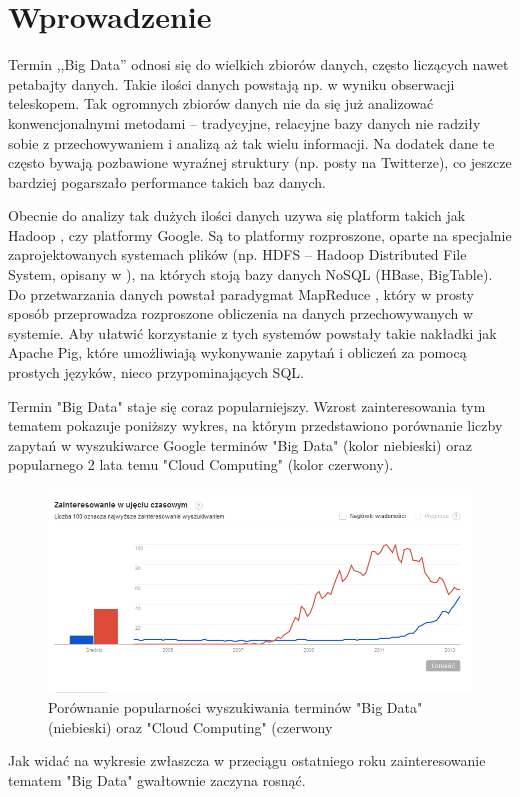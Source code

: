 \section{Wprowadzenie}
\label{sec:Wprowadzenie}

Termin ,,Big Data'' odnosi się do wielkich zbiorów danych, często liczących nawet petabajty danych. Takie ilości danych powstają np. w wyniku obserwacji teleskopem. Tak ogromnych zbiorów danych nie da się już analizować konwencjonalnymi metodami -- tradycyjne, relacyjne bazy danych nie radziły sobie z przechowywaniem i analizą aż tak wielu informacji. Na dodatek dane te często bywają pozbawione wyraźnej struktury (np. posty na Twitterze), co jeszcze bardziej pogarszało performance takich baz danych.

Obecnie do analizy tak dużych ilości danych uzywa się platform takich jak Hadoop \cite{apache:hadoop}, czy platformy Google. Są to platformy rozproszone, oparte na specjalnie zaprojektowanych systemach plików (np. HDFS -- Hadoop Distributed File System, opisany w \cite{shvachko10}), na których stoją bazy danych NoSQL (HBase, BigTable). Do przetwarzania danych powstał paradygmat MapReduce \cite{dean08}, który w prosty sposób przeprowadza rozproszone obliczenia na danych przechowywanych w systemie. Aby ułatwić korzystanie z tych systemów powstały takie nakładki jak Apache Pig, które umożliwiają wykonywanie zapytań i obliczeń za pomocą prostych języków, nieco przypominających SQL.

Termin "Big Data" staje się coraz popularniejszy. Wzrost zainteresowania tym tematem pokazuje poniższy wykres, na którym przedstawiono porównanie liczby zapytań w wyszukiwarce Google terminów "Big Data" (kolor niebieski) oraz popularnego 2 lata temu "Cloud Computing" \cite{chmura_obliczeniowa} (kolor czerwony).

\begin{figure}[h]
\centerline{\includegraphics[scale=2.5]{obrazki/trend-big-data_cloud-computing.png}}
\caption{Porównanie popularności wyszukiwania terminów "Big Data" (niebieski) oraz "Cloud Computing" (czerwony}
\label{fig:big_data_popularnosc}
\end{figure}

Jak widać na wykresie zwłaszcza w przeciągu ostatniego roku zainteresowanie tematem "Big Data" gwałtownie zaczyna rosnąć.

